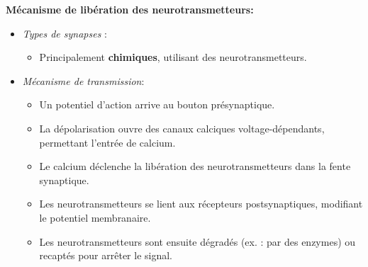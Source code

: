 \textbf{Mécanisme de libération des neurotransmetteurs:}\\
\begin{itemize}
	\item [$\diamond$]\textit{Types de synapses} :
	\begin{itemize} 
		\item[-] Principalement \textbf{chimiques}, utilisant des neurotransmetteurs.
	\end{itemize}
	\item [$\diamond$] \textit{Mécanisme de transmission}:
	\begin{itemize}
		\item[-] Un potentiel d'action arrive au bouton présynaptique.
		\item[-] La dépolarisation ouvre des canaux calciques voltage-dépendants, permettant l'entrée de calcium.
		\item[-] Le calcium déclenche la libération des neurotransmetteurs dans la fente synaptique.
		\item[-] Les neurotransmetteurs se lient aux récepteurs postsynaptiques, modifiant le potentiel membranaire.
		\item[-] Les neurotransmetteurs sont ensuite dégradés (ex. : par des enzymes) ou recaptés pour arrêter le signal.
	\end{itemize}
\end{itemize}